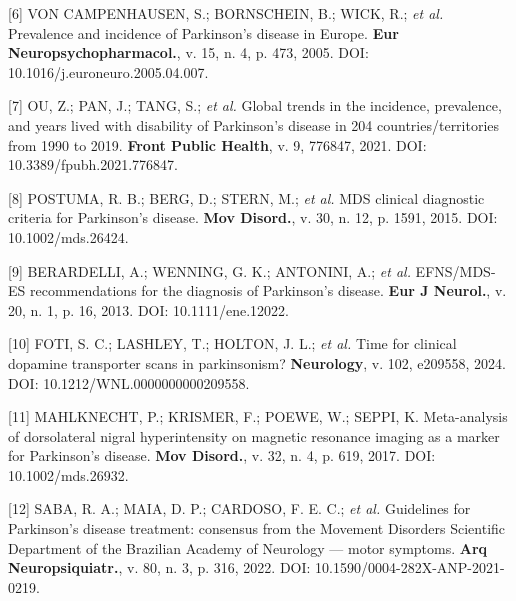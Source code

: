 \documentclass[12pt,a4paper,oneside]{article}
\begin{document}
\begin{singlespace}
\noindent\hangindent=1.25cm\label{ref:vonCampenhausen}
[6] VON CAMPENHAUSEN, S.; BORNSCHEIN, B.; WICK, R.; \textit{et al.}
Prevalence and incidence of Parkinson's disease in Europe.
\textbf{Eur Neuropsychopharmacol.}, v. 15, n. 4,
p. 473, 2005. DOI:
10.1016/j.euroneuro.2005.04.007.\par\smallskip

\noindent\hangindent=1.25cm\label{ref:trends}
[7] OU, Z.; PAN, J.; TANG, S.; \textit{et al.} Global trends in the
incidence, prevalence, and years lived with disability of
Parkinson's disease in 204 countries/territories from 1990 to 2019.
\textbf{Front Public Health}, v. 9, 776847, 2021. DOI:
10.3389/fpubh.2021.776847.\par\smallskip

\noindent\hangindent=1.25cm\label{ref:mds-criteria}
[8] POSTUMA, R. B.; BERG, D.; STERN, M.; \textit{et al.} MDS
clinical diagnostic criteria for Parkinson's disease.
\textbf{Mov Disord.}, v. 30, n. 12, p. 1591, 2015.
DOI: 10.1002/mds.26424.\par\smallskip

\noindent\hangindent=1.25cm\label{ref:efns-mds}
[9] BERARDELLI, A.; WENNING, G. K.; ANTONINI, A.; \textit{et al.}
EFNS/MDS-ES recommendations for the diagnosis of Parkinson's
disease. \textbf{Eur J Neurol.}, v. 20, n. 1, p. 16,
2013. DOI: 10.1111/ene.12022.\par\smallskip

\noindent\hangindent=1.25cm\label{ref:aan}
[10] FOTI, S. C.; LASHLEY, T.; HOLTON, J. L.; \textit{et al.} Time
for clinical dopamine transporter scans in parkinsonism?
\textbf{Neurology}, v. 102, e209558, 2024. DOI:
10.1212/WNL.0000000000209558.\par\smallskip

\noindent\hangindent=1.25cm\label{ref:swallow}
[11] MAHLKNECHT, P.; KRISMER, F.; POEWE, W.; SEPPI, K. Meta-analysis
of dorsolateral nigral hyperintensity on magnetic resonance imaging
as a marker for Parkinson's disease. \textbf{Mov Disord.}, v. 32,
n. 4, p. 619, 2017. DOI: 10.1002/mds.26932.\par\smallskip

\noindent\hangindent=1.25cm\label{ref:saba}
[12] SABA, R. A.; MAIA, D. P.; CARDOSO, F. E. C.; \textit{et al.}
Guidelines for Parkinson's disease treatment: consensus from the
Movement Disorders Scientific Department of the Brazilian Academy
of Neurology — motor symptoms. \textbf{Arq Neuropsiquiatr.}, v. 80,
n. 3, p. 316, 2022. DOI:
10.1590/0004-282X-ANP-2021-0219.\par\smallskip


\end{singlespace}
\end{document}
